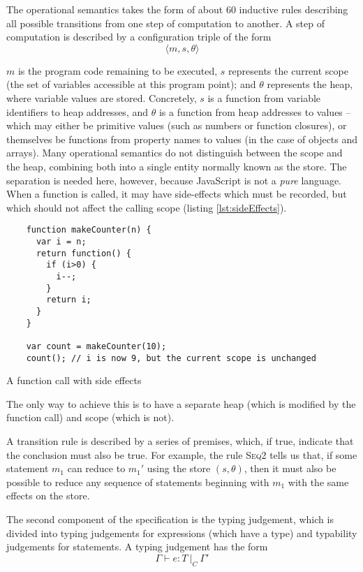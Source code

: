 \documentclass[12pt,a4paper,twoside,openright]{report}
\begin{document}
The operational semantics takes the form of about 60 inductive rules describing
all possible transitions from one step of computation to another. A step of
computation is described by a configuration triple of the form $$\langle m,
s,\theta\rangle$$

$m$ is the program code remaining to be executed, $s$ represents the current
scope (the set of variables accessible at this program point); and $\theta$
represents the heap, where variable values are stored.  Concretely, $s$ is a
function from variable identifiers to heap addresses, and $\theta$ is a
function from heap addresses to values -- which may either be primitive values
(such as numbers or function closures), or themselves be functions from
property names to values (in the case of objects and arrays).  Many operational
semantics do not distinguish between the scope and the heap, combining both
into a single entity normally known as the store. The separation is needed
here, however, because JavaScript is not a \textit{pure} language.  When a
function is called, it may have side-effects which must be recorded, but which
should not affect the calling scope (listing \ref{lst:sideEffects}).
\begin{program}[h]
  \begin{verbatim}
	function makeCounter(n) {
	  var i = n;
	  return function() {
		if (i>0) {
		  i--;
		}
		return i;
	  }
	}

	var count = makeCounter(10);
	count(); // i is now 9, but the current scope is unchanged
  \end{verbatim}
  \label{lst:sideEffects}
  \caption{A function call with side effects}
\end{program}
The only way to achieve this is to have a separate heap (which is modified by
the function call) and scope (which is not).

A transition rule is described by a series of premises, which, if true,
indicate that the conclusion must also be true. For example, the rule
\textsc{Seq2} tells us that, if some statement $m_1$ can reduce to $m_1'$ using
the store $(s,\theta)$, then it must also be possible to reduce any sequence of
statements beginning with $m_1$ with the same effects on the store.

The second component of the specification is the typing judgement, which is
divided into typing judgements for expressions (which have a type) and
typability judgements for statements. A typing judgement has the form 
$$\Gamma\vdash e : T\ |_C\ \Gamma'$$
\end{document}

